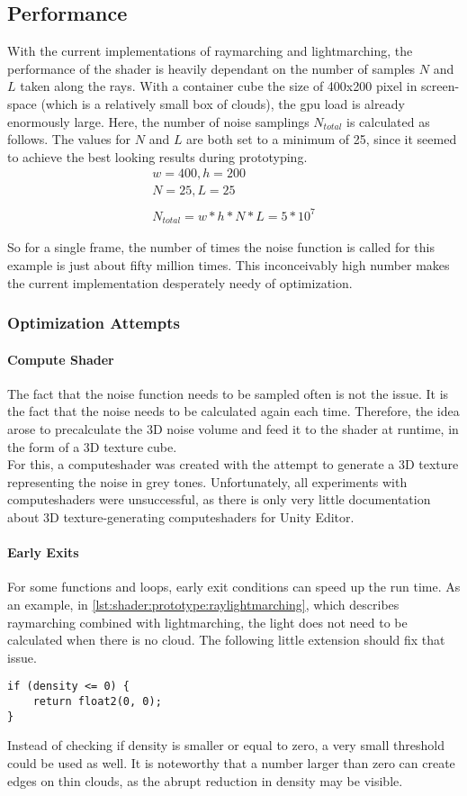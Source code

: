 \clearpage
\subsection{Performance}
With the current implementations of \gls{raymarching} and \gls{lightmarching}, the performance of the shader is heavily dependant on the number of samples $N$ and $L$ taken along the rays.
With a container cube the size of 400x200 pixel in screen-space (which is a relatively small box of clouds), the \gls{gpu} load is already enormously large. 
Here, the number of noise samplings $N_{total}$ is calculated as follows. The values for $N$ and $L$ are both set to a minimum of 25, since it seemed to achieve the best looking results during prototyping.
$$ 
\begin{array}{l}
    w = 400, h = 200\\
    N = 25, L = 25\\ \\
    N_{total} = w * h * N * L = 5 * 10^7
\end{array}
$$

\noindent
So for a single frame, the number of times the noise function is called for this example is just about fifty million times. This inconceivably high number makes the current implementation desperately needy of optimization.

\subsubsection{Optimization Attempts}
\paragraph{Compute Shader}
The fact that the noise function needs to be sampled often is not the issue. It is the fact that the noise needs to be calculated again each time.
Therefore, the idea arose to precalculate the 3D noise volume and feed it to the shader at runtime, in the form of a 3D texture cube.
\\
For this, a \gls{computeshader} was created with the attempt to generate a 3D texture representing the noise in grey tones.
Unfortunately, all experiments with \gls{computeshader}s were unsuccessful, as there is only very little documentation about 3D texture-generating \gls{computeshader}s for Unity Editor.

\paragraph{Early Exits}
For some functions and loops, early exit conditions can speed up the run time. As an example, in \autoref{lst:shader:prototype:raylightmarching}, which describes \gls{raymarching} combined with \gls{lightmarching}, the light does not need to be calculated when there is no cloud.
The following little extension should fix that issue.
\begin{lstlisting}[language=HLSL]
if (density <= 0) {
    return float2(0, 0);
}
\end{lstlisting}

\noindent
Instead of checking if density is smaller or equal to zero, a very small threshold could be used as well.
It is noteworthy that a number larger than zero can create edges on thin clouds, as the abrupt reduction in density may be visible.